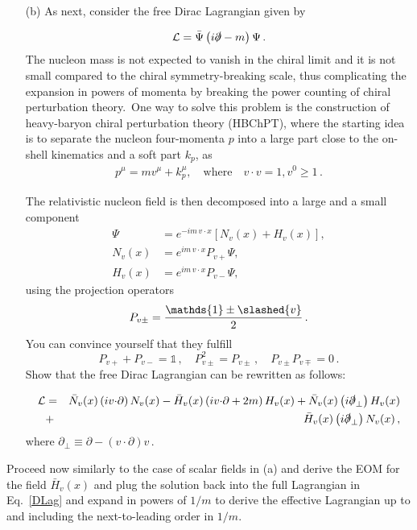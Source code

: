 \documentclass[prd,%
,superscriptaddress,%
nofootinbib,%
tightenlines ]{revtex4}
\newcommand{\eins}{\mathds{1}}
\newcommand{\vs}{\slashed{v}}
\newcommand{\comment}[1]{\textbf{[#1]}}
\begin{document}
\begin{itemize}
\item[(b)]As next, consider the free Dirac Lagrangian given by

\begin{eqnarray}
\mathcal{L} = \bar \Psi \left( i \slashed{\partial}  - m \right) \Psi
\,.
\end{eqnarray}
 The nucleon mass is not expected to vanish in the chiral limit and it is not small compared to the chiral symmetry-breaking scale, thus complicating the expansion in powers of momenta by breaking the power counting of chiral perturbation theory.~One way to solve this problem is the construction of heavy-baryon chiral perturbation theory (HBChPT), where the starting idea is to separate the nucleon four-momenta $p$ into a large part close to the on-shell kinematics and a soft part $k_p$, as 
\begin{gather}
p^{\mu}=m v^{\mu} + k_p^{\mu},\quad \text{where}\quad v\cdot v=1, v^0\geq 1\,.
\end{gather}


The relativistic nucleon field is then decomposed into a large and a small component
\begin{align}
\Psi&=e^{-im\,v\cdot x}\left[N_v(x)+H_v(x)\right],
\\
N_v(x)&=e^{im\,v\cdot x} P_{v+}\Psi,
\\
H_v(x)&=e^{im\,v\cdot x} P_{v-}\Psi,
\end{align}
using the projection operators
\begin{equation}
P_{v\pm}=\frac{\eins\pm\vs}{2}
\,.
\end{equation}
You can convince yourself that they fulfill
	\begin{equation}
P_{v+}+P_{v-}=\eins\,,\quad
P_{v\pm}^2=P_{v\pm}\,,\quad
P_{v\pm}P_{v\mp}=0\,.
\end{equation}
Show that the free Dirac Lagrangian can be rewritten as follows:

\begin{eqnarray}
\mathcal{L}
&=&
 \bar N_v(x) \left( i v {\cdot} \partial \right) N_v(x) -  \bar H_v(x) \left( i v {\cdot} \partial + 2m  \right) H_v(x) +  \bar N_v(x) \left( i \slashed{\partial}_\perp \right) H_v(x) 
\nonumber
\\
&+& \bar H_v(x) \left(  i \slashed{\partial}_\perp  \right) N_v(x)\,,
\label{DLag}
\end{eqnarray}
where $\partial_\perp \equiv \partial -  (v {\cdot} \partial) v$\,.
\end{itemize}
Proceed now similarly to the case of scalar fields in (a) and derive the EOM for the field $\bar H_v(x)$ and plug the solution back into the full Lagrangian in Eq.~\eqref{DLag} and expand in powers of
$1/m$ to derive the effective Lagrangian up to and including the next-to-leading order in $1/m$.
\end{document}
